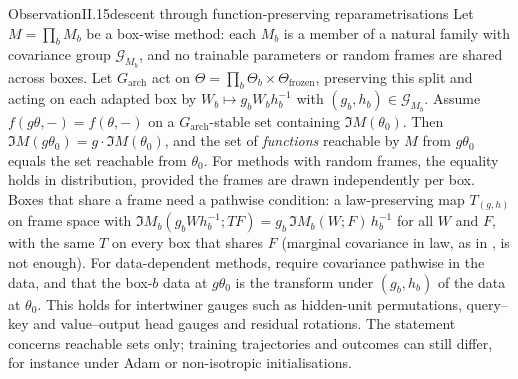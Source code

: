 \begin{restate}{Observation}{II.15}{descent through function-preserving reparametrisations}
Let $M=\prod_bM_b$ be a box-wise method: each $M_b$ is a member of a natural family with covariance group
$\mathcal G_{M_b}$, and no trainable parameters or random frames are shared across boxes. Let $G_{\mathrm{arch}}$ act on
$\Theta=\prod_b\Theta_b\times\Theta_{\mathrm{frozen}}$, preserving this split and acting on each adapted box by
$W_b\mapsto g_bW_bh_b^{-1}$ with $(g_b,h_b)\in\mathcal G_{M_b}$. Assume $f(g\theta,-)=f(\theta,-)$ on a
$G_{\mathrm{arch}}$-stable set containing $\Im M(\theta_0)$. Then $\Im M(g\theta_0)=g\cdot\Im M(\theta_0)$, and the set
of \emph{functions} reachable by $M$ from $g\theta_0$ equals the set reachable from $\theta_0$. For methods with random
frames, the equality holds in distribution, provided the frames are drawn independently per box. Boxes that share a
frame need a pathwise condition: a law-preserving map $T_{(g,h)}$ on frame space with
$\Im M_b(g_bWh_b^{-1};TF)=g_b\,\Im M_b(W;F)\,h_b^{-1}$ for all $W$ and $F$, with the same $T$ on every box that shares
$F$ (marginal covariance in law, as in , is not enough). For data-dependent methods, require
covariance pathwise in the data, and that the box-$b$ data at $g\theta_0$ is the  transform
under $(g_b,h_b)$ of the data at $\theta_0$. This holds for intertwiner gauges such as hidden-unit permutations,
query--key and value--output head gauges and residual rotations. The statement concerns reachable sets only; training
trajectories and outcomes can still differ, for instance under Adam or non-isotropic initialisations.


\end{restate}
